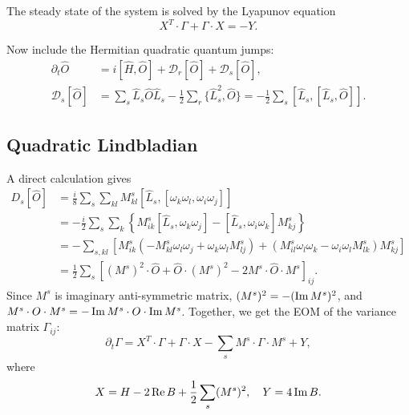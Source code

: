 \documentclass{SciPost}
\begin{document}
The steady state of the system is solved by the Lyapunov equation
\begin{equation}
	X^T\cdot\Gamma + \Gamma \cdot X = - Y.
\end{equation}


Now include the Hermitian quadratic quantum jumps:
\begin{equation}
\begin{aligned}
	\partial_t \hat O &= i[\hat H, \hat O] + \mathcal D_r[\hat O] + \mathcal D_s[\hat O], \\
	\mathcal D_s[\hat O] 
	&= \sum_s \hat L_s \hat O\hat L_s - \frac{1}{2} \sum_r\{\hat L_s^2, \hat O \}
	= -\frac{1}{2} \sum_s [\hat L_s,[\hat L_s,\hat O]].
\end{aligned}
\end{equation}

\subsection{Quadratic Lindbladian}
A direct calculation gives
\begin{equation}
\begin{aligned}
	D_s[\hat O]
	&= \frac{i}{8} \sum_s \sum_{kl} M^s_{kl} [\hat L_s,[\omega_k \omega_l, \omega_i \omega_j]] \\
	&= -\frac{i}{2}\sum_s \sum_{k} \left\{ M^s_{ik}[\hat L_s,\omega_k \omega_j]-[\hat L_s,\omega_i \omega_k]M^s_{kj} \right\} \\
	&= -\sum_{s,kl} \left[ M^s_{ik}(-M^s_{kl}\omega_l\omega_j+\omega_k\omega_l M^s_{lj})+(M^s_{il}\omega_l\omega_k-\omega_i\omega_l M^s_{lk})M^s_{kj} \right] \\
	&= \frac{1}{2}\sum_s \left[(M^s)^2 \cdot \hat O + \hat O\cdot(M^s)^2 -2 M^s \cdot\hat O\cdot M^s\right]_{ij}.
\end{aligned}
\end{equation}
Since $M^s$ is imaginary anti-symmetric matrix, $(M^s)^2 = - (\operatorname{Im} M^s)^2$, and $M^s \cdot O \cdot M^s = - \operatorname{Im} M^s \cdot O \cdot \operatorname{Im} M^s$.
Together, we get the EOM of the variance matrix $\Gamma_{ij}$:
\begin{equation}
	\partial_t \Gamma = X^T\cdot\Gamma + \Gamma \cdot X - \sum_s M^s \cdot \Gamma\cdot M^s + Y,
\end{equation}
where
\begin{equation}
\begin{aligned}
	X = H - 2\operatorname{Re}{B} + \frac{1}{2} \sum_s (M^s)^2, \quad
	Y = 4\operatorname{Im}{B}.
\end{aligned}
\end{equation}
\end{document}
